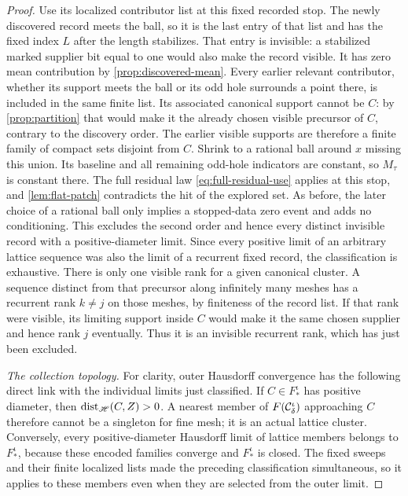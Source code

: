 \begin{proof}
Use its localized contributor list at this fixed recorded stop.
The newly discovered record meets the ball, so it is the last entry
of that list and has the fixed index \(L\) after the length stabilizes.
That entry is invisible: a stabilized marked supplier bit equal to
one would also make the record visible. It has zero mean contribution
by \cref{prop:discovered-mean}. Every earlier relevant contributor,
whether its support meets the ball or its odd hole surrounds a point
there, is included in the same finite list. Its associated canonical
support cannot be \(C\): by \cref{prop:partition} that would make
it the already chosen visible precursor of \(C\), contrary to the
discovery order. The earlier visible supports are therefore a finite
family of compact sets disjoint from \(C\). Shrink to a rational ball
around \(x\) missing this union. Its baseline and all remaining
odd-hole indicators are constant, so \(M_\tau\) is constant there.
The full residual law \cref{eq:full-residual-use} applies at this
stop, and \cref{lem:flat-patch} contradicts the hit of the explored
set. As before, the later choice of a rational ball only implies
a stopped-data zero event and adds no conditioning.
This excludes the second order and hence every distinct invisible
record with a positive-diameter limit. Since every positive limit
of an arbitrary lattice sequence was also the limit of a recurrent
fixed record, the classification is exhaustive. There is only one
visible rank for a given canonical cluster. A sequence distinct from
that precursor along infinitely many meshes has a recurrent rank
\(k\ne j\) on those meshes, by finiteness of the record list. If that
rank were visible, its limiting support inside \(C\) would make it
the same chosen supplier and hence rank \(j\) eventually. Thus it is
an invisible recurrent rank, which has just been excluded.

\emph{The collection topology.}
For clarity, outer Hausdorff convergence has the following direct
link with the individual limits just classified. If \(C\in F_*^\iota\)
has positive diameter, then
\(\operatorname{dist}_{\mathscr H}(C,Z)>0\). A nearest member of
\(F(\mathcal C_\delta^\iota)\) approaching \(C\) therefore cannot be a
singleton for fine mesh; it is an actual lattice cluster.
Conversely, every positive-diameter Hausdorff limit of lattice
members belongs to \(F_*^\iota\), because these encoded families
converge and \(F_*^\iota\) is closed. The fixed sweeps and their
finite localized lists made the preceding classification simultaneous,
so it applies to these members even when they are selected from the
outer limit.


\end{proof}
